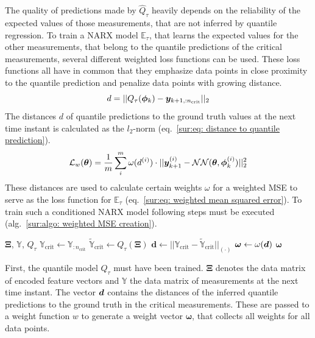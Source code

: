 The quality of predictions made by $\hat{Q}_\tau$ heavily depends on the reliability of the expected
values of those measurements, that are not inferred by quantile regression.
To train a NARX model $\mathbb{E}_\tau$, that learns
the expected values for the other measurements, that belong to the quantile predictions of the critical measurements,
several different weighted loss functions can be used. These loss functions all have in common that they
emphasize data points in close proximity to the quantile prediction and penalize data points with growing distance.
\begin{equation}
    \label{sur:eq: distance to quantile prediction}
    d = || Q_\tau(\bm{\phi}_k) - {\bm{y}}_{k+1,:n_\text{crit}}||_2
\end{equation}
The distances $d$ of quantile predictions to the ground truth values at the next time instant is 
calculated as the $l_2$-norm (eq.~\ref{sur:eq: distance to quantile prediction}). 
\begin{equation}
    \label{sur:eq: weighted mean squared error}
    \mathcal{L}_w(\bm{\theta}) = 
    \frac{1}{m} \sum^m_i \omega(d^{(i)}) \cdot
    || {\bm{y}}^{(i)}_{k+1} - \mathcal{NN}(\bm{\theta}, \bm{\phi}^{(i)}_k) ||_2^2
\end{equation}
These distances
are used to calculate certain weights $\omega$ for a weighted MSE to serve as the loss function for 
$\mathbb{E}_\tau$ (eq.~\ref{sur:eq: weighted mean squared error}). To train such a conditioned NARX model
following steps must be executed (alg.~\ref{sur:algo: weighted MSE creation}).

\begin{algorithm}
	\caption{Calculation of the quantile based weights for a weighted MSE.}
	\label{sur:algo: weighted MSE creation}
	\begin{algorithmic}
		\REQUIRE $\bm{\Xi}$, $\mathbb{Y}$, $Q_\tau$
        \STATE $\mathbb{Y}_\text{crit} \leftarrow \mathbb{Y}_{:n_\text{crit}}$
        \STATE $\tilde{\mathbb{Y}}_\text{crit} \leftarrow Q_\tau(\bm{\Xi})$
        \STATE $\bm{d} \leftarrow || \mathbb{Y}_\text{crit} - \tilde{\mathbb{Y}}_\text{crit} ||_{(\cdot)}$
        \STATE $\bm{\omega} \leftarrow \omega({\bm{d}})$
        \RETURN $\bm{\omega}$
	\end{algorithmic}
\end{algorithm}

\noindent
First, the quantile model $Q_\tau$ must have been trained. $\bm{\Xi}$ denotes the data matrix of encoded feature
vectors and $\mathbb{Y}$ the data matrix of measurements at the next time instant. The vector ${\bm{d}}$ contains the
distances of the inferred quantile predictions to the ground truth in the critical measurements.
These are passed to a weight function $w$ to generate a weight vector $\bm{\omega}$, that collects all weights
for all data points.

